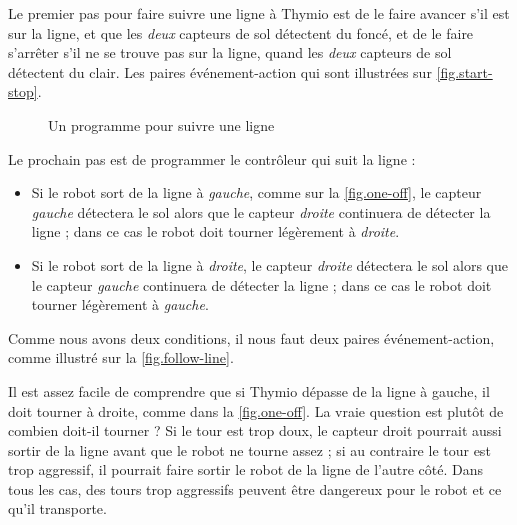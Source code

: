 Le premier pas pour faire suivre une ligne à Thymio est de le faire avancer s'il est sur la ligne, et que les \emph{deux} capteurs de sol détectent du foncé, et de le faire s'arrêter s'il ne se trouve pas sur la ligne, quand les \emph{deux} capteurs de sol détectent du clair.
Les paires événement-action qui sont illustrées sur \cref{fig.start-stop}.


\begin{figure}
	\hfill
	\caption{Un programme pour suivre une ligne}
\end{figure}


Le prochain pas est de programmer le contrôleur qui suit la ligne :

\begin{itemize}
	\item Si le robot sort de la ligne à \emph{gauche}, comme sur la \cref{fig.one-off}, le capteur \emph{gauche} détectera le sol alors que le capteur \emph{droite} continuera de détecter la ligne ; dans ce cas le robot doit tourner légèrement à \emph{droite}.

	\item Si le robot sort de la ligne à \emph{droite}, le capteur \emph{droite} détectera le sol alors que le capteur \emph{gauche} continuera de détecter la ligne ; dans ce cas le robot doit tourner légèrement à \emph{gauche}.
	
\end{itemize}

Comme nous avons deux conditions, il nous faut deux paires événement-action, comme illustré sur la \cref{fig.follow-line}.


Il est assez facile de comprendre que si Thymio dépasse de la ligne à gauche, il doit tourner à droite, comme dans la \cref{fig.one-off}.
La vraie question est plutôt de combien doit-il tourner ?
Si le tour est trop doux, le capteur droit pourrait aussi sortir de la ligne avant que le robot ne tourne assez ; si au contraire le tour est trop aggressif, il pourrait faire sortir le robot de la ligne de l'autre côté.
Dans tous les cas, des tours trop aggressifs peuvent être dangereux pour le robot et ce qu'il transporte.


